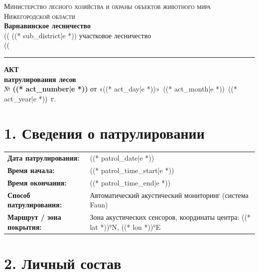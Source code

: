 \documentclass[12pt, a4paper]{article}
\begin{document}
\thispagestyle{fancy}

\begin{center}
    {\small\textsc{Министерство лесного хозяйства и охраны объектов животного мира}}\\
    {\small\textsc{Нижегородской области}}\\[4pt]
    {\normalsize\textbf{Варнавинское лесничество}}\\
((%
    {\small ((* sub_district|e *)) участковое лесничество}\\
((%
\end{center}

\noindent\rule{\textwidth}{0.8pt}

\vspace{0.6cm}

\begin{center}
    {\Large\textbf{АКТ}}\\[2pt]
    {\large\textbf{патрулирования лесов}}\\[6pt]
    № \textbf{((* act_number|e *))} \hfill от «((* act_day|e *))»~((* act_month|e *))~((* act_year|e *))~г.
\end{center}

\vspace{0.4cm}

\section{1. Сведения о патрулировании}

\noindent
\begin{tabularx}{\textwidth}{@{}>{\bfseries}p{5.5cm}X@{}}
    Дата патрулирования: & ((* patrol_date|e *)) \\[3pt]
    Время начала: & ((* patrol_time_start|e *)) \\[3pt]
    Время окончания: & ((* patrol_time_end|e *)) \\[3pt]
    Способ патрулирования: & Автоматический акустический мониторинг (система Faun) \\[3pt]
    Маршрут / зона покрытия: & Зона акустических сенсоров, координаты центра: ((* lat *))°N, ((* lon *))°E \\
\end{tabularx}

\section{2. Личный состав}
\end{document}
